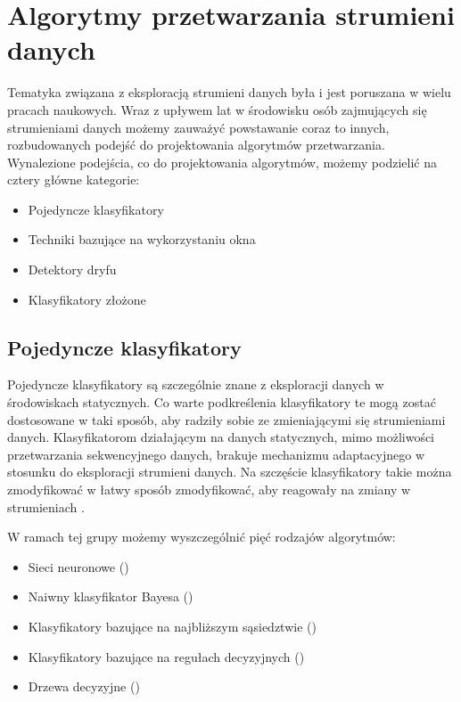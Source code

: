 \section{Algorytmy przetwarzania strumieni danych}
\label{Teoria:Algorytmy}

Tematyka związana z eksploracją strumieni danych była i jest poruszana w wielu pracach naukowych. Wraz z upływem lat w środowisku osób zajmujących się strumieniami danych możemy zauważyć powstawanie coraz to innych, rozbudowanych podejść do projektowania algorytmów przetwarzania. Wynalezione podejścia, co do projektowania algorytmów, możemy podzielić na cztery główne kategorie:

\begin{itemize}
    \item Pojedyncze klasyfikatory
    \item Techniki bazujące na wykorzystaniu okna
    \item Detektory dryfu
    \item Klasyfikatory złożone
\end{itemize}

\subsection{Pojedyncze klasyfikatory}

\noindent Pojedyncze klasyfikatory są szczególnie znane z eksploracji danych w środowiskach statycznych. Co warte podkreślenia klasyfikatory te mogą zostać dostosowane w taki sposób, aby radziły sobie ze zmieniającymi się strumieniami danych. Klasyfikatorom działającym na danych statycznych, mimo możliwości przetwarzania sekwencyjnego danych, brakuje mechanizmu adaptacyjnego w stosunku do eksploracji strumieni danych. Na szczęście klasyfikatory takie można zmodyfikować w łatwy sposób zmodyfikować, aby reagowały na zmiany w strumieniach \cite{BrzezPhd2015}. 

W ramach tej grupy możemy wyszczególnić pięć rodzajów algorytmów:

\begin{itemize}
    \item Sieci neuronowe () \cite{Article:NeuralNetworks}
    \item Naiwny klasyfikator Bayesa () \cite{Article:NaiveBayes}
    \item Klasyfikatory bazujące na najbliższym sąsiedztwie () \cite{Article:Neighbours}
    \item Klasyfikatory bazujące na regułach decyzyjnych () \cite{Article:DecisionRules}
    \item Drzewa decyzyjne ()
\end{itemize}

